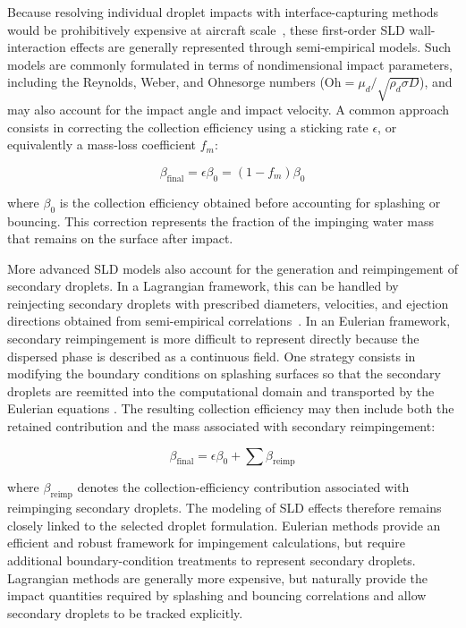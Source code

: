 Because resolving individual droplet impacts with interface-capturing methods would be prohibitively expensive at aircraft scale~\cite{habashiSPH}, these first-order SLD wall-interaction effects are generally represented through semi-empirical models. Such models are commonly formulated in terms of nondimensional impact parameters, including the Reynolds, Weber, and Ohnesorge numbers ($\mathrm{Oh} = \mu_d/\sqrt{\rho_d \sigma D}$), and may also account for the impact angle and impact velocity. A common approach consists in correcting the collection efficiency using a sticking rate $\epsilon$, or equivalently a mass-loss coefficient $f_m$:

\begin{equation}
\beta_{\mathrm{final}}
=
\epsilon \beta_0
=
\left(1-f_m\right)\beta_0
\label{eq:sld_corrected_beta}
\end{equation}

where $\beta_0$ is the collection efficiency obtained before accounting for splashing or bouncing. This correction represents the fraction of the impinging water mass that remains on the surface after impact.

More advanced SLD models also account for the generation and reimpingement of secondary droplets. In a Lagrangian framework, this can be handled by reinjecting secondary droplets with prescribed diameters, velocities, and ejection directions obtained from semi-empirical correlations~\cite{sirianni2023numerical}. In an Eulerian framework, secondary reimpingement is more difficult to represent directly because the dispersed phase is described as a continuous field. One strategy consists in modifying the boundary conditions on splashing surfaces so that the secondary droplets are reemitted into the computational domain and transported by the Eulerian equations \cite{bilodeau2016numerical,capizzano2023extending}. The resulting collection efficiency may then include both the retained contribution and the mass associated with secondary reimpingement:

\begin{equation}
\beta_{\mathrm{final}}
=
\epsilon \beta_0
+
\sum \beta_{\mathrm{reimp}}
\label{eq:sld_reimp_beta}
\end{equation}

where $\beta_{\mathrm{reimp}}$ denotes the collection-efficiency contribution associated with reimpinging secondary droplets. The modeling of SLD effects therefore remains closely linked to the selected droplet formulation. Eulerian methods provide an efficient and robust framework for impingement calculations, but require additional boundary-condition treatments to represent secondary droplets. Lagrangian methods are generally more expensive, but naturally provide the impact quantities required by splashing and bouncing correlations and allow secondary droplets to be tracked explicitly.

